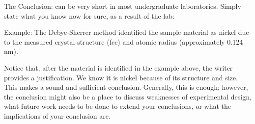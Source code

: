 The Conclusion: can be very short in most 
undergraduate laboratories.
Simply state what you know now for sure, as a result of the lab: 

Example: The Debye-Sherrer method identified 
the sample material as nickel due to the measured 
crystal structure (fcc) and atomic radius 
(approximately 0.124 nm).

Notice that, after the material is identified in the 
example above, the writer provides a justification. 
We know it is nickel because of its structure and 
size. This makes a sound and sufficient 
conclusion. Generally, this is enough; however, 
the conclusion might also be a place to discuss 
weaknesses of experimental design, what future 
work needs to be done to extend your conclusions, 
or what the implications of your conclusion are.